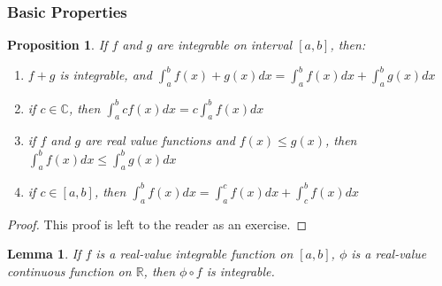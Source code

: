 \documentclass[a4paper]{article}
\newtheorem{prop}{Proposition}
\newtheorem{lemma}{Lemma}
\begin{document}
\subsubsection{Basic Properties}
\begin{prop}
    If $f$ and $g$ are integrable on interval $[a,b]$, then:
    \begin{enumerate}
        \item $f+g$ is integrable, and $\int_{a}^{b}f(x)+g(x)dx = \int_a^b f(x)dx + \int_a^b g(x)dx$
        \item if $c \in \mathbb{C}$, then $\int_{a}^{b}c f(x)dx = c\int_a^b f(x)dx$
        \item if $f$ and $g$ are real value functions and $f(x)\leq g(x)$, then $\int_a^b f(x)dx \leq \int_a^b g(x)dx$
        \item if $c \in [a, b]$, then $\int_a^b f(x)dx = \int_a^c f(x)dx + \int_c^b f(x)dx$
    \end{enumerate}
\end{prop}
\begin{proof}[Proof]
    This proof is left to the reader as an exercise.
\end{proof}

\begin{lemma}
    If $f$ is a real-value integrable function on $[a,b]$, $\phi$ is a real-value continuous function on $\mathbb{R}$, then $\phi \circ f$ is integrable.
\end{lemma}
\end{document}
